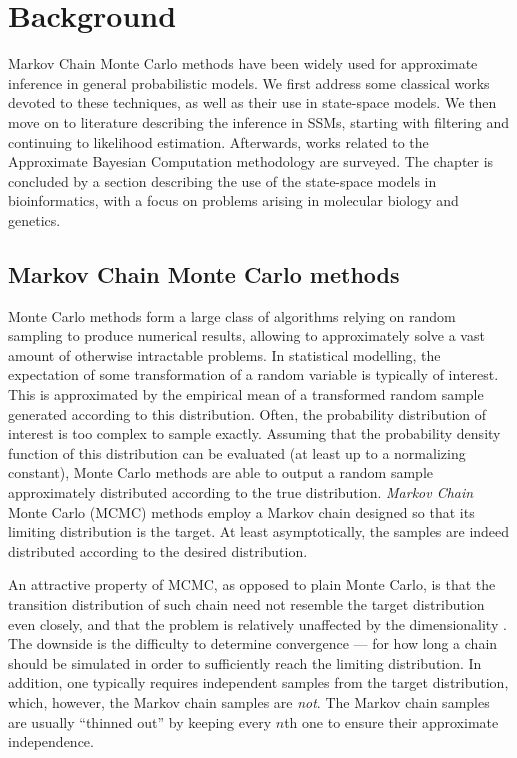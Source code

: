 \chapter{Background}
\label{chap:related-work}

Markov Chain Monte Carlo methods have been widely used for approximate inference in general probabilistic models. We first address some classical works devoted to these techniques, as well as their use in state-space models. We then move on to literature describing the inference in SSMs, starting with filtering and continuing to likelihood estimation. Afterwards, works related to the Approximate Bayesian Computation methodology are surveyed. The chapter is concluded by a section describing the use of the state-space models in bioinformatics, with a focus on problems arising in molecular biology and genetics.

\section{Markov Chain Monte Carlo methods}
Monte Carlo methods \citep{robert-casella} form a large class of algorithms relying on random sampling to produce numerical results, allowing to approximately solve a vast amount of otherwise intractable problems. In statistical modelling, the expectation of some transformation of a random variable is typically of interest. This is approximated by the empirical mean of a transformed random sample generated according to this distribution. Often, the probability distribution of interest is too complex to sample exactly. Assuming that the probability density function of this distribution can be evaluated (at least up to a normalizing constant), Monte Carlo methods are able to output a random sample approximately distributed according to the true distribution. \emph{Markov Chain} Monte Carlo (MCMC) methods \citep{mcmc} employ a Markov chain designed so that its limiting distribution is the target. At least asymptotically, the samples are indeed distributed according to the desired distribution.

An attractive property of MCMC, as opposed to plain Monte Carlo, is that the transition distribution of such chain need not resemble the target distribution even closely, and that the problem is relatively unaffected by the dimensionality \citep{information-theory}. The downside is the difficulty to determine convergence --- for how long a chain should be simulated in order to sufficiently reach the limiting distribution. In addition, one typically requires independent samples from the target distribution, which, however, the Markov chain samples are \emph{not}. The Markov chain samples are usually ``thinned out'' by keeping every $n$th one to ensure their approximate independence.

